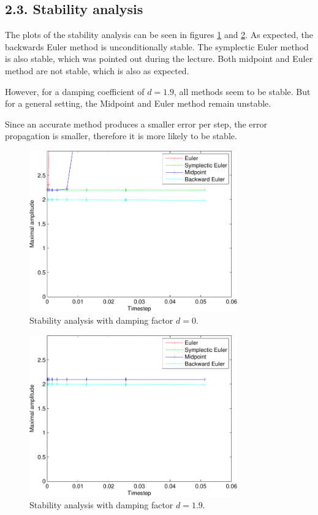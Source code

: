 \subsection*{2.3. Stability analysis}
The plots of the stability analysis can be seen in figures \ref{fig:stabanald0} and \ref{fig:stabanald19}. As expected, the backwards Euler method is unconditionally stable. The symplectic Euler method is also stable, which was pointed out during the lecture. Both midpoint and Euler method are not stable, which is also as expected.

However, for a damping coefficient of $d=1.9$, all methods seem to be stable. But for a general setting, the Midpoint and Euler method remain unstable.

Since an accurate method produces a smaller error per step, the error propagation is smaller, therefore it is more likely to be stable.

\begin{figure}
	\centering
		\includegraphics*[width=0.8\textwidth]{../data/ex1/stabilityMeasurementDamp0-crop.pdf}
	\caption{Stability analysis with damping factor $d=0$.}
	\label{fig:stabanald0} 
\end{figure}
\begin{figure}
	\centering
		\includegraphics*[width=0.8\textwidth]{../data/ex1/stabilityMeasurementDamp1_9-crop.pdf}
	\caption{Stability analysis with damping factor $d=1.9$.}
	\label{fig:stabanald19} 
\end{figure}

